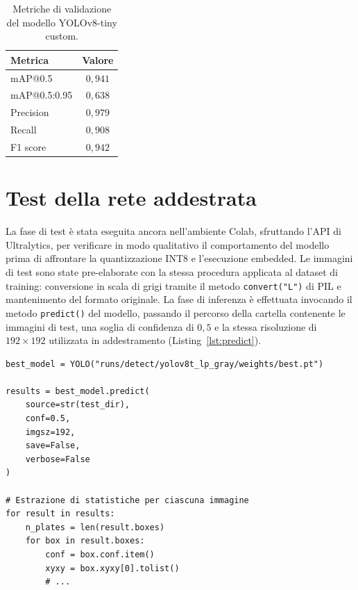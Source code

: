 \begin{table}[H]
    \centering
    \caption{Metriche di validazione del modello YOLOv8-tiny custom.}
    \label{tab:yolo-metrics}
    \begin{tabular}{lc}
        \toprule
        \textbf{Metrica} & \textbf{Valore} \\
        \midrule
        mAP@0.5         & $0{,}941$ \\
        mAP@0.5:0.95    & $0{,}638$ \\
        Precision       & $0{,}979$ \\
        Recall          & $0{,}908$ \\
        F1 score        & $0{,}942$ \\
        \bottomrule
    \end{tabular}
\end{table}

\section{Test della rete addestrata}
\label{sec:testing-rete}

La fase di test è stata eseguita ancora nell'ambiente Colab, sfruttando l'API di Ultralytics, per verificare in modo qualitativo il comportamento del modello prima di affrontare la quantizzazione INT8 e l'esecuzione embedded. Le immagini di test sono state pre-elaborate con la stessa procedura applicata al dataset di training: conversione in scala di grigi tramite il metodo \texttt{convert("L")} di PIL e mantenimento del formato originale. La fase di inferenza è effettuata invocando il metodo \texttt{predict()} del modello, passando il percorso della cartella contenente le immagini di test, una soglia di confidenza di $0{,}5$ e la stessa risoluzione di $192\times192$ utilizzata in addestramento (Listing~\ref{lst:predict}).

\begin{lstlisting}[style=stilePython, caption={Inferenza su un insieme di immagini di test tramite l'API Ultralytics.}, label={lst:predict}]
best_model = YOLO("runs/detect/yolov8t_lp_gray/weights/best.pt")

results = best_model.predict(
    source=str(test_dir),
    conf=0.5,
    imgsz=192,
    save=False,
    verbose=False
)

# Estrazione di statistiche per ciascuna immagine
for result in results:
    n_plates = len(result.boxes)
    for box in result.boxes:
        conf = box.conf.item()
        xyxy = box.xyxy[0].tolist()
        # ...
\end{lstlisting}

